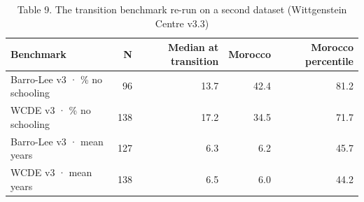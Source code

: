 \begin{table}
\caption{Table 9. The transition benchmark re-run on a second dataset (Wittgenstein Centre v3.3)}
\label{tab:T9_benchmark_robustness}
\begin{tabular}{lrrrr}
\toprule
Benchmark & N & Median at transition & Morocco & Morocco percentile \\
\midrule
Barro-Lee v3 · \% no schooling & 96 & 13.7 & 42.4 & 81.2 \\
WCDE v3 · \% no schooling & 138 & 17.2 & 34.5 & 71.7 \\
Barro-Lee v3 · mean years & 127 & 6.3 & 6.2 & 45.7 \\
WCDE v3 · mean years & 138 & 6.5 & 6.0 & 44.2 \\
\bottomrule
\end{tabular}
\end{table}
